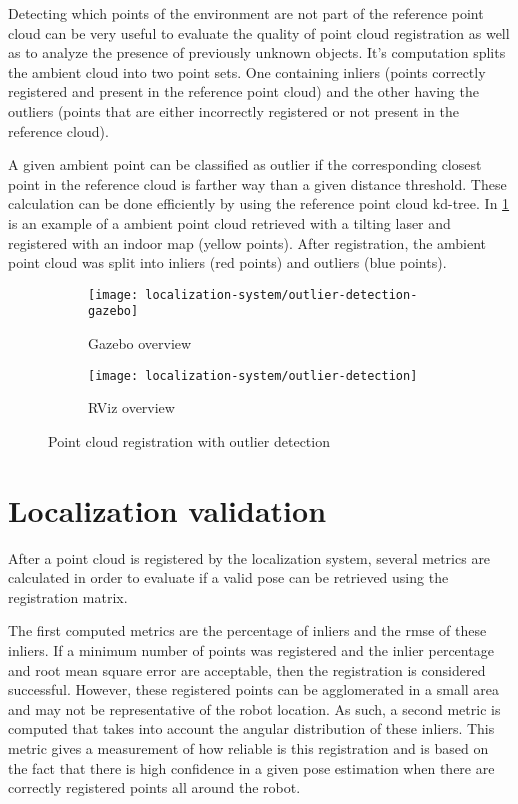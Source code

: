 Detecting which points of the environment are not part of the reference point cloud can be very useful to evaluate the quality of point cloud registration as well as to analyze the presence of previously unknown objects. It's computation splits the ambient cloud into two point sets. One containing inliers (points correctly registered and present in the reference point cloud) and the other having the outliers (points that are either incorrectly registered or not present in the reference cloud).

A given ambient point can be classified as outlier if the corresponding closest point in the reference cloud is farther way than a given distance threshold. These calculation can be done efficiently by using the reference point cloud kd-tree. In \cref{fig:localization-system_outlier-detection} is an example of a ambient point cloud retrieved with a tilting laser and registered with an indoor map (yellow points). After registration, the ambient point cloud was split into inliers (red points) and outliers (blue points).


\begin{figure}
	\centering
	\begin{subfigure}[h]{0.497\textwidth}
		\centering
		\texttt{[image: localization-system/outlier-detection-gazebo]}
		\caption{Gazebo overview}
	\end{subfigure}
	\begin{subfigure}[h]{0.497\textwidth}
		\centering
		\texttt{[image: localization-system/outlier-detection]}
		\caption{RViz overview}
	\end{subfigure}\hfill
	\caption{Point cloud registration with outlier detection}
	\label{fig:localization-system_outlier-detection}
\end{figure}



\section{Localization validation}

After a point cloud is registered by the localization system, several metrics are calculated in order to evaluate if a valid pose can be retrieved using the registration matrix.

The first computed metrics are the percentage of inliers and the \gls{rmse} of these inliers. If a minimum number of points was registered and the inlier percentage and root mean square error are acceptable, then the registration is considered successful. However, these registered points can be agglomerated in a small area and may not be representative of the robot location. As such, a second metric is computed that takes into account the angular distribution of these inliers. This metric gives a measurement of how reliable is this registration and is based on the fact that there is high confidence in a given pose estimation when there are correctly registered points all around the robot.


